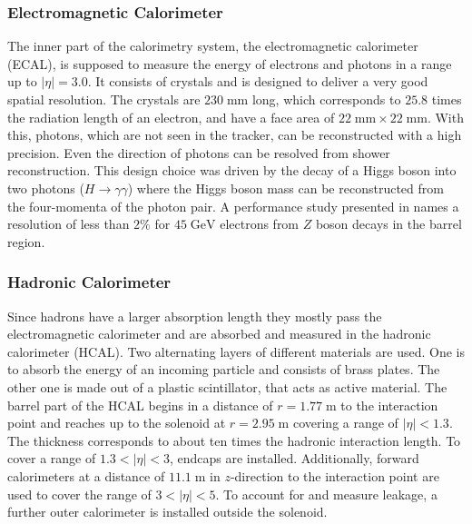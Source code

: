 \subsubsection{Electromagnetic Calorimeter}
	The inner part of the calorimetry system, the electromagnetic calorimeter (ECAL), is supposed to measure the energy of electrons and photons in a range up to $|\eta| = 3.0$. It consists of  crystals and is designed to deliver a very good spatial resolution. The crystals are $230\;\text{mm}$ long, which corresponds to $25.8$ times the radiation length of an electron, and have a face area of $22\;\text{mm} \times 22\;\text{mm}$. With this, photons, which are not seen in the tracker, can be reconstructed with a high precision. Even the direction of photons can be resolved from shower reconstruction. This design choice was driven by the decay of a Higgs boson into two photons ($H\rightarrow \gamma \gamma$) where the Higgs boson mass can be reconstructed from the four-momenta of the photon pair. A performance study presented in \cite{EGammaPerformance} names a resolution of less than $2\%$ for $45\;\text{GeV}$ electrons from $Z$ boson decays in the barrel region.

\subsubsection{Hadronic Calorimeter}
	Since hadrons have a larger absorption length they mostly pass the electromagnetic calorimeter and are absorbed and measured in the hadronic calorimeter (HCAL). Two alternating layers of different materials are used. One is to absorb the energy of an incoming particle and consists of brass plates. The other one is made out of a plastic scintillator, that acts as active material. The barrel part of the HCAL begins in a distance of $r=1.77\;\text{m}$ to the interaction point and reaches up to the solenoid at $r=2.95\;\text{m}$ covering a range of $|\eta| < 1.3$. The thickness corresponds to about ten times the hadronic interaction length. To cover a range of $1.3 < |\eta| < 3$, endcaps are installed. Additionally, forward calorimeters at a distance of $11.1\;\text{m}$ in $z$-direction to the interaction point are used to cover the range of $3 < |\eta| < 5$. To account for and measure leakage, a further outer calorimeter is installed outside the solenoid. 

 
